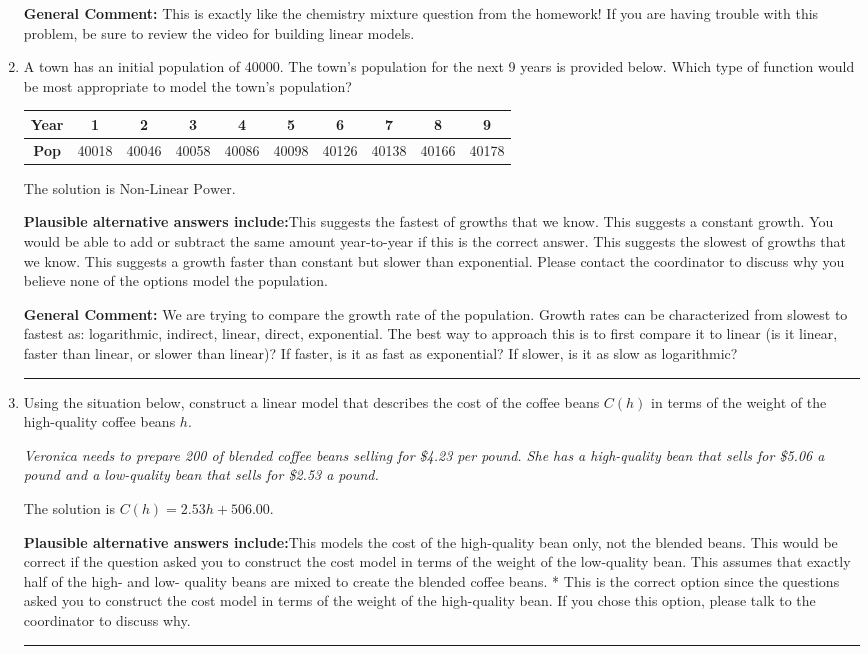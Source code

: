 \documentclass{extbook}[14pt]
\newcommand{\litem}[1]{\item #1

\rule{\textwidth}{0.4pt}}
\begin{document}
\begin{enumerate}
{\textbf{General Comment:} This is exactly like the chemistry mixture question from the homework! If you are having trouble with this problem, be sure to review the video for building linear models.
}
\litem{
A town has an initial population of 40000. The town's population for the next 9 years is provided below. Which type of function would be most appropriate to model the town's population?


\begin{tabular}{c|c|c|c|c|c|c|c|c|c}
\textbf{Year} &1 &2 &3 &4 &5 &6 &7 &8 &9\tabularnewline \hline
\textbf{Pop} &40018 &40046 &40058 &40086 &40098 &40126 &40138 &40166 &40178\end{tabular}The solution is \( \text{Non-Linear Power} \).\begin{enumerate}[label=\Alph*.]
\textbf{Plausible alternative answers include:}This suggests the fastest of growths that we know.
This suggests a constant growth. You would be able to add or subtract the same amount year-to-year if this is the correct answer.
This suggests the slowest of growths that we know.
This suggests a growth faster than constant but slower than exponential.
Please contact the coordinator to discuss why you believe none of the options model the population.
\end{enumerate}

\textbf{General Comment:} We are trying to compare the growth rate of the population. Growth rates can be characterized from slowest to fastest as: logarithmic, indirect, linear, direct, exponential. The best way to approach this is to first compare it to linear (is it linear, faster than linear, or slower than linear)? If faster, is it as fast as exponential? If slower, is it as slow as logarithmic?
}
\litem{
Using the situation below, construct a linear model that describes the cost of the coffee beans $C(h)$ in terms of the weight of the high-quality coffee beans $h$.

\begin{center}
    \textit{ Veronica needs to prepare 200 of blended coffee beans selling for \$4.23 per pound. She has a high-quality bean that sells for \$5.06 a pound and a low-quality bean that sells for \$2.53 a pound. }
\end{center}
The solution is \( C(h) = 2.53 h + 506.00 \).\begin{enumerate}[label=\Alph*.]
\textbf{Plausible alternative answers include:}This models the cost of the high-quality bean only, not the blended beans.
This would be correct if the question asked you to construct the cost model in terms of the weight of the low-quality bean.
This assumes that exactly half of the high- and low- quality beans are mixed to create the blended coffee beans.
* This is the correct option since the questions asked you to construct the cost model in terms of the weight of the high-quality bean.
If you chose this option, please talk to the coordinator to discuss why.
\end{enumerate}

}
\end{enumerate}
\end{document}
